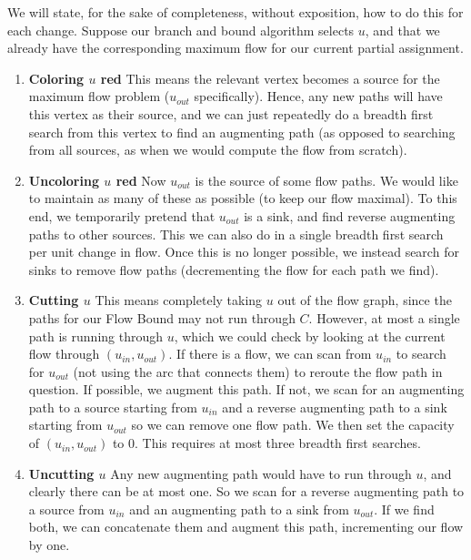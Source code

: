 	We will state, for the sake of completeness,
	without exposition, how to do this for each change. Suppose
	our branch and bound algorithm selects $u$, and that we already have the
	corresponding maximum flow for our current partial assignment.
	\begin{enumerate}
		\item[] \textbf{Coloring $u$ red} This means the relevant vertex
			becomes a source for the maximum flow problem ($u_{out}$
			specifically). Hence, any new paths will have this vertex as their
			source, and we can just repeatedly do a breadth first search from
			this vertex to find an augmenting path (as opposed to searching
			from all sources, as when we would compute the flow from scratch).
		\item[] \textbf{Uncoloring $u$ red} Now $u_{out}$ is the source of 
			some flow paths. We would like to maintain as many of these as
			possible (to keep our flow maximal). To this end, we temporarily
			pretend that $u_{out}$ is a sink, and find reverse augmenting paths
			to other sources. This we can also do in a single breadth first
			search per unit change in flow. Once this is no longer possible,
			we instead search for sinks to remove flow paths (decrementing the
			flow for each path we find).
		\item[] \textbf{Cutting $u$} This means completely taking $u$ out of
			the flow graph, since the paths for our Flow Bound may not run
			through $C$. However, at most a single path is running through
			$u$, which we could check by looking at the current flow through
			$(u_{in}, u_{out})$. If there is a flow, we can scan from $u_{in}$
			to search for $u_{out}$ (not using the arc that connects them) to
			reroute the flow path in question. If possible, we augment this
			path. If not, we scan for an augmenting path to a source starting
			from $u_{in}$ and a reverse augmenting path to a
			sink starting from $u_{out}$ so we can remove one flow path. We
			then set the capacity of $(u_{in}, u_{out})$ to $0$. This requires
			at most three breadth first searches.
		\item[] \textbf{Uncutting $u$} Any new augmenting path would have to
			run through $u$, and clearly there can be at most one. So we scan
			for a reverse augmenting path to a source from $u_{in}$ and an
			augmenting path to a sink from $u_{out}$. If we find both, we can
			concatenate them and augment this path, incrementing our flow by
			one.
	\end{enumerate}

